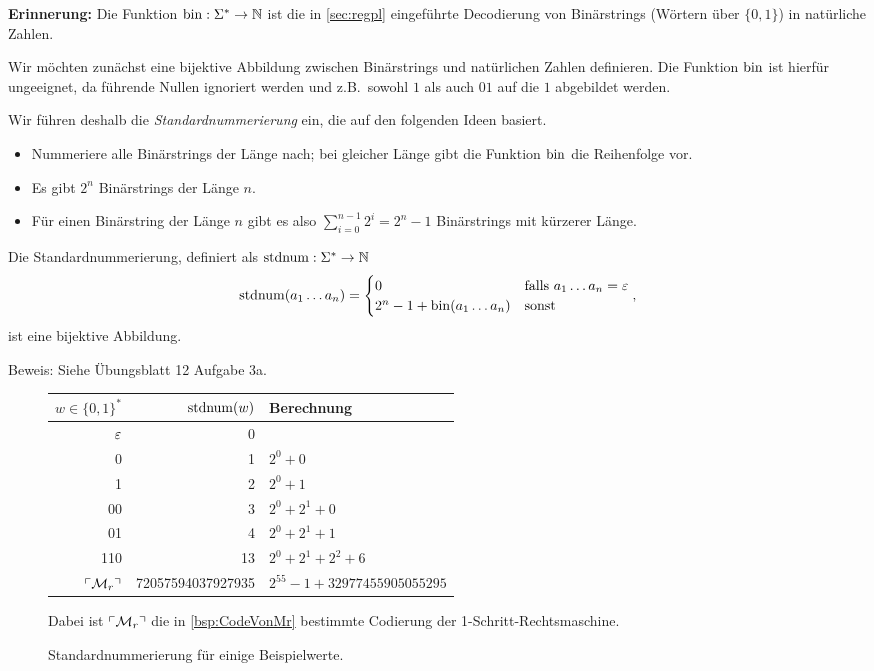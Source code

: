 \textbf{Erinnerung: } Die Funktion $\operatorname{bin}:\Sigma^*\rightarrow\mathbb{N}$ 
ist die in \autoref{sec:regpl} eingeführte Decodierung von Binärstrings (Wörtern über $\{0,1\}$) in natürliche Zahlen.

Wir möchten zunächst eine bijektive Abbildung zwischen Binärstrings und natürlichen Zahlen definieren.
Die Funktion $\operatorname{bin}$ ist hierfür ungeeignet, da führende Nullen ignoriert werden und z.B.\ sowohl $1$ als auch $01$ auf die $1$ abgebildet werden.

Wir führen deshalb die \emph{Standardnummerierung} ein, die auf den folgenden Ideen basiert.
\begin{itemize}
	\item Nummeriere alle Binärstrings der Länge nach; bei gleicher Länge gibt die Funktion $\operatorname{bin}$ die Reihenfolge vor.
	\item Es gibt $2^n$ Binärstrings der Länge $n$.
	\item Für einen Binärstring der Länge $n$ gibt es also $\sum\limits_{i=0}^{n-1} 2^i = 2^n-1$ Binärstrings mit kürzerer Länge.
\end{itemize}


\begin{lemma}[name={[Standardnummerierung $\stdnum$]}]\label{satz:stdnum}
	Die Standardnummerierung, definiert als $\operatorname{stdnum}: \Sigma^*\rightarrow\mathbb{N}$ 
	$$ \operatorname{stdnum}(a_1\dots a_n)=\begin{cases}
		0 & \text{falls } a_1\dots a_n=\varepsilon\\
		2^{n}-1+\operatorname{bin}(a_1\dots a_n) & \text{sonst}
	\end{cases},$$
	ist eine bijektive Abbildung.
\end{lemma}
Beweis: Siehe Übungsblatt 12 Aufgabe 3a.


 \begin{figure}[H]\centering
    \begin{tabular}{rr@{\qquad}l}
    $w\in\{0,1\}^*$ & $\operatorname{stdnum}(w)$ & Berechnung\\ \hline
    $\varepsilon$ & 0 \\
    0 & 1 & $2^0 + 0$\\
    1 & 2 & $2^0 + 1$\\
    00 & 3 & $2^0 + 2^1 + 0$\\
    01 & 4 & $2^0 + 2^1 + 1$\\
    110 & 13 & $2^0 + 2^1 + 2^2 + 6$\\
    $\ulcorner \mathcal{M}_r \urcorner$ & 72057594037927935 & $2^{55} - 1 + 32977455905055295$
    \end{tabular}
	
	\smallskip
	
	Dabei ist $\ulcorner \mathcal{M}_r \urcorner$
	die in \autoref{bsp:CodeVonMr} 
	bestimmte Codierung der 1-Schritt-Rechtsmaschine.

	\caption{Standardnummerierung für einige Beispielwerte.}
\end{figure}


